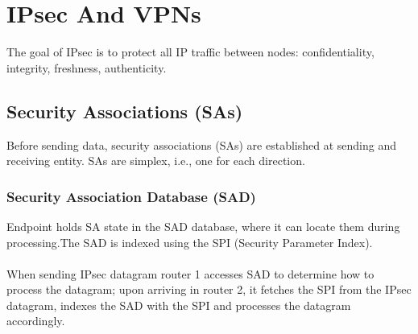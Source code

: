 \documentclass[10pt,a4paper]{report}
\begin{document}
\section{IPsec And VPNs}
The goal of IPsec is to protect all IP traffic between nodes: confidentiality, integrity, freshness, authenticity.
\subsection{Security Associations (SAs)}
Before sending data, security associations (SAs) are established at sending and receiving entity. SAs are simplex, i.e., one for each direction.
\subsubsection{Security Association Database (SAD)}
Endpoint holds SA state in the SAD database, where it can locate them during processing.The SAD is indexed using the SPI (Security Parameter Index).\\
\\
When sending IPsec datagram router 1 accesses SAD to determine how to process the datagram; upon arriving in router 2, it fetches the SPI from the IPsec datagram, indexes the SAD with the SPI and processes the datagram accordingly.
\end{document}

